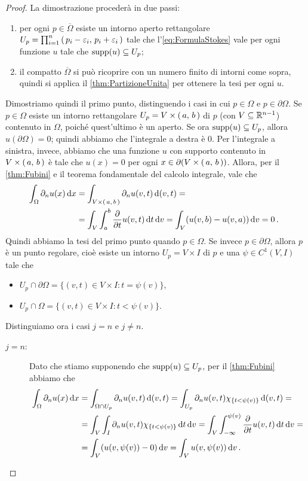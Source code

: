 \begin{proof}
	La dimostrazione procederà in due passi:
	\begin{enumerate}
		\item per ogni $p\in \overline\Omega$ esiste un intorno aperto rettangolare $U_p=\prod_{i=1}^n \left(\,p_i-\varepsilon_i,\,p_i+\varepsilon_i\,\right)$
			tale che l'\cref{eq:FormulaStokes} vale per ogni funzione $u$ tale che $\operatorname{supp}(u)\subseteq U_p$;
		\item il compatto $\overline\Omega$ si può ricoprire con un numero finito di intorni come sopra, quindi si applica il \cref{thm:PartizioneUnita} per ottenere
			la tesi per ogni $u$.
	\end{enumerate}
	
	Dimostriamo quindi il primo punto, distinguendo i casi in cui $p\in \Omega$ e $p\in \partial \Omega$.
	Se $p\in \Omega$ esiste un intorno rettangolare $U_p=V\times \left(\,a,\,b\,\right)$ di $p$ (con $V\subseteq \mathbb R^{n-1}$) contenuto in $\Omega$, poiché quest'ultimo è un aperto. Se ora $\operatorname{supp}(u)\subseteq U_p$,
	allora $u(\partial \Omega)=0$; quindi abbiamo che l'integrale a destra è $0$. Per l'integrale a sinistra, invece, abbiamo che una funzione $u$
	con supporto contenuto in $V\times \left(\,a,\,b\,\right)$ è tale che $u(x)=0$ per ogni
	$x\in \partial (V\times \left(\,a,\,b\,\right))$. Allora, per il \cref{thm:Fubini} e il teorema fondamentale del calcolo integrale, vale che
	\begin{align*}
		\int_{\Omega} \partial_n u(x) \,\mathrm d x &= \int_{V\times \left(\,a,\,b\,\right)} \partial_n u(v,t) \,\mathrm d (v,t) = \\
		& = \int_V \int_a^b \frac{\partial}{\partial t} u(v,t) \,\mathrm d t \,\mathrm d v = \int_V (u(v,b) - u(v,a)) \,\mathrm d v = 0\, \text{. }
	\end{align*}
	Quindi abbiamo la tesi del primo punto quando $p\in\Omega$. Se invece $p\in \partial \Omega$, allora $p$ è un punto regolare, cioè esiste
	un intorno $U_p=V\times I$ di $p$ e una $\psi\in C^1(V,I)$ tale che
	\begin{itemize}
		\item $U_p\cap \partial \Omega = \{(v,t)\in V\times I:t=\psi(v)\}$,
		\item $U_p\cap \Omega = \{(v,t)\in V\times I:t<\psi(v)\}$.
	\end{itemize}
	Distinguiamo ora i casi $j=n$ e $j\neq n$.
	\begin{description}
		\item [$j=n$:] Dato che stiamo supponendo che $\operatorname{supp}(u)\subseteq U_p$, per il \cref{thm:Fubini} abbiamo che
			\begin{align*}
				\int_{\Omega} \partial_n u(x) \,\mathrm d x  &= \int_{\Omega\cap U_p} \partial_n u(v,t)\,\mathrm d (v,t) =
				\int_{U_p} \partial_n u(v,t) \chi_{\{t<\psi(v)\}} \,\mathrm d (v,t) = \\
				& = \int_V \int_I \partial_n u(v,t) \chi_{\{t<\psi(v)\}} \,\mathrm d t \,\mathrm d v =
				\int_V \int_{-\infty}^{\psi(v)} \frac{\partial}{\partial t} u(v,t) \,\mathrm d t \,\mathrm d v = \\
				& = \int_V (u(v,\psi(v)) - 0) \,\mathrm d v = \int_V u(v,\psi(v)) \,\mathrm d v\, \text{. }
			\end{align*}
			

\end{description}
\end{proof}
